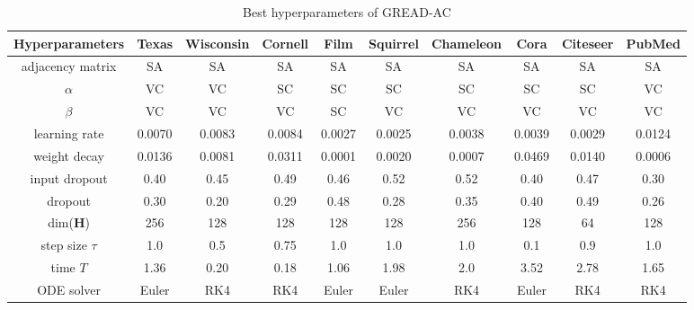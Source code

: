 \documentclass{article}
\theoremstyle{plain}
\theoremstyle{definition}
\theoremstyle{remark}
\begin{document}
\begin{table*}[ht!]
    \centering
    \small
    \caption{Best hyperparameters of GREAD-AC}
    \label{tab:best_AC}
    \begin{tabular}{c ccccccccc} \toprule
        Hyperparameters  & Texas  & Wisconsin 
                                           & Cornell& Film   & Squirrel 
                                                                      & Chameleon
                                                                               & Cora   & Citeseer 
                                                                                                 & PubMed\\ \midrule
        adjacency matrix & SA     & SA     & SA     & SA     & SA     & SA     & SA     & SA     & SA    \\
        $\alpha$         & VC     & VC     & SC     & SC     & SC     & SC     & SC     & SC     & VC    \\
        $\beta$          & VC     & VC     & VC     & SC     & VC     & VC     & VC     & VC     & VC    \\
        learning rate    & 0.0070 & 0.0083 & 0.0084 & 0.0027 & 0.0025 & 0.0038 & 0.0039 & 0.0029 & 0.0124\\
        weight decay     & 0.0136 & 0.0081 & 0.0311 & 0.0001 & 0.0020 & 0.0007 & 0.0469 & 0.0140 & 0.0006\\
        input dropout    & 0.40   & 0.45   & 0.49   & 0.46   & 0.52   & 0.52   & 0.40   & 0.47   & 0.30\\
        dropout          & 0.30   & 0.20   & 0.29   & 0.48   & 0.28   & 0.35   & 0.40   & 0.49   & 0.26\\
        dim($\mathbf{H}$)& 256    & 128    & 128    & 128    & 128    & 256    & 128    & 64     & 128\\
        step size $\tau$ & 1.0    & 0.5    & 0.75   & 1.0    & 1.0    & 1.0    & 0.1    & 0.9    & 1.0\\
        time $T$         & 1.36   & 0.20   & 0.18   & 1.06   & 1.98   & 2.0    & 3.52   & 2.78   & 1.65\\
        ODE solver       & Euler  & RK4    & RK4    & Euler  & Euler  & RK4    & Euler    & RK4    & RK4  \\
        \bottomrule
    \end{tabular}
\end{table*}
\end{document}

